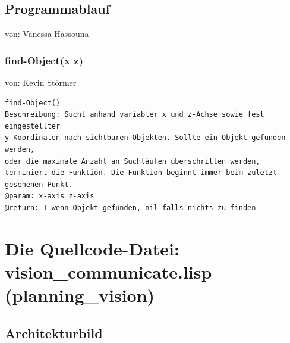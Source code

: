 \documentclass{suturo}
\makeatletter
\newcommand{\chapterauthor}[1]{%
  {\parindent0pt\vspace*{-27pt}%
  \linespread{0}\small\begin{flushright}von: #1\end{flushright}%
  \par\nobreak\vspace*{0pt}}
  \@afterheading%
}
\makeatother
\begin{document}
\subsection{Programmablauf}
\chapterauthor{Vanessa Hassouna}


\begin{figure}[!htb]
\end{figure}





\subsubsection{find-Object(x z)}
\chapterauthor{Kevin Störmer}
\begin{verbatim}
find-Object()
Beschreibung: Sucht anhand variabler x und z-Achse sowie fest eingestellter
y-Koordinaten nach sichtbaren Objekten. Sollte ein Objekt gefunden werden,
oder die maximale Anzahl an Suchläufen überschritten werden,
terminiert die Funktion. Die Funktion beginnt immer beim zuletzt gesehenen Punkt.
@param: x-axis z-axis
@return: T wenn Objekt gefunden, nil falls nichts zu finden
\end{verbatim}




\newpage
\section{Die Quellcode-Datei: vision\_communicate.lisp (planning\_vision)}

\subsection{Architekturbild}
\end{document}
